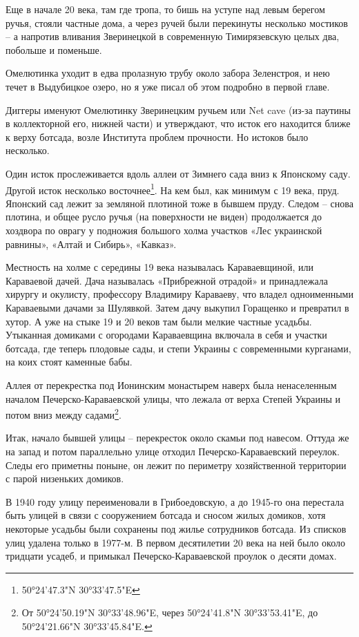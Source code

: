 Еще в начале 20 века, там где тропа, то бишь на уступе над левым берегом ручья, стояли частные дома, а через ручей были перекинуты несколько мостиков – а напротив вливания Зверинецкой в современную Тимирязевскую целых два, побольше и поменьше.

Омелютинка уходит в едва пролазную трубу около забора Зеленстроя, и нею течет в Выдубицкое озеро, но я уже писал об этом подробно в первой главе.

Диггеры именуют Омелютинку Зверинецким ручьем или Net cave (из-за паутины в коллекторной его, нижней части) и утверждают, что исток его находится ближе к верху ботсада, возле Института проблем прочности. Но истоков было несколько.

Один исток прослеживается вдоль аллеи от Зимнего сада вниз к Японскому саду. Другой исток несколько восточнее\footnote{50°24'47.3"N 30°33'47.5"E}. На кем был, как минимум с 19 века, пруд. Японский сад лежит за земляной плотиной тоже в бывшем пруду. Следом – снова плотина, и общее русло ручья (на поверхности не виден) продолжается до хоздвора по оврагу у подножия большого холма участков «Лес украинской равнины», «Алтай и Сибирь», «Кавказ».


Местность на холме с середины 19 века называлась Караваевщиной, или Караваевой дачей. Дача называлась «Прибрежной отрадой» и принадлежала хирургу и окулисту, профессору Владимиру Караваеву, что владел одноименными Караваевыми дачами за Шулявкой. Затем дачу выкупил Горащенко и превратил в хутор. А уже на стыке 19 и 20 веков там были  мелкие частные усадьбы. Утыканная домиками с огородами Караваевщина включала в себя и участки ботсада, где теперь плодовые сады, и степи Украины с современными  курганами, на коих стоят каменные бабы.

Аллея от перекрестка под Ионинским монастырем наверх была ненаселенным началом Печерско-Караваевской улицы, что лежала от верха Степей Украины и потом вниз между садами\footnote{От 50°24'50.19"N 30°33'48.96"E, через 50°24'41.8"N 30°33'53.41"E, до 50°24'21.66"N 30°33'45.84"E.}. 

Итак, начало бывшей улицы – перекресток около скамьи под навесом. Оттуда же на запад и потом параллельно улице отходил Печерско-Караваевский переулок. Следы его приметны поныне, он лежит по периметру хозяйственной территории с парой низеньких домиков.

В 1940 году улицу переименовали в Грибоедовскую, а до 1945-го она перестала быть улицей в связи с сооружением ботсада и сносом жилых домиков, хотя некоторые усадьбы были сохранены под жилье сотрудников ботсада. Из списков улиц удалена только в 1977-м. В первом десятилетии 20 века на ней было около тридцати усадеб, и примыкал Печерско-Караваевской проулок о десяти домах.

